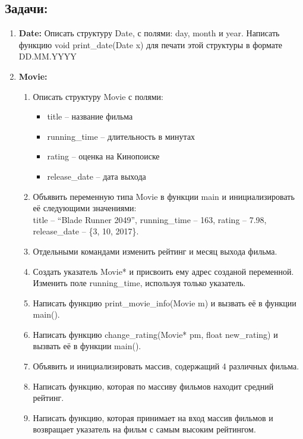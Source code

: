 \documentclass{article}
\begin{document}
\subsection*{Задачи:}
\begin{enumerate}
\item \textbf{Date:} Описать структуру Date, с полями: day, month и year. Написать функцию void print\_date(Date x) для печати этой структуры в формате DD.MM.YYYY
\item \textbf{Movie:}
\begin{enumerate}
\item Описать структуру Movie с полями: 
\begin{itemize}
\item title -- название фильма
\item running\_time -- длительность в минутах
\item rating -- оценка на Кинопоиске
\item release\_date -- дата выхода
\end{itemize}
\item Объявить переменную типа Movie в функции main и инициализировать её следующими значениями:\\
title -- ``Blade Runner 2049'', running\_time -- 163, rating -- 7.98, release\_date -- \{3, 10, 2017\}.
\item Отдельными командами изменить рейтинг и месяц выхода фильма.
\item Создать указатель Movie* и присвоить ему адрес созданой переменной.  Изменить поле running\_time, используя только указатель.
\item Написать функцию print\_movie\_info(Movie m) и вызвать её в функции main().
\item Написать функцию change\_rating(Movie* pm, float new\_rating) и вызвать её в функции main().
\item Объявить и инициализировать массив, содержащий 4 различных фильма.
\item Написать функцию, которая по массиву фильмов находит средний рейтинг.
\item Написать функцию, которая принимает на вход массив фильмов и возвращает указатель на фильм с самым высоким рейтингом.
\end{enumerate}
\end{enumerate}
\end{document}
